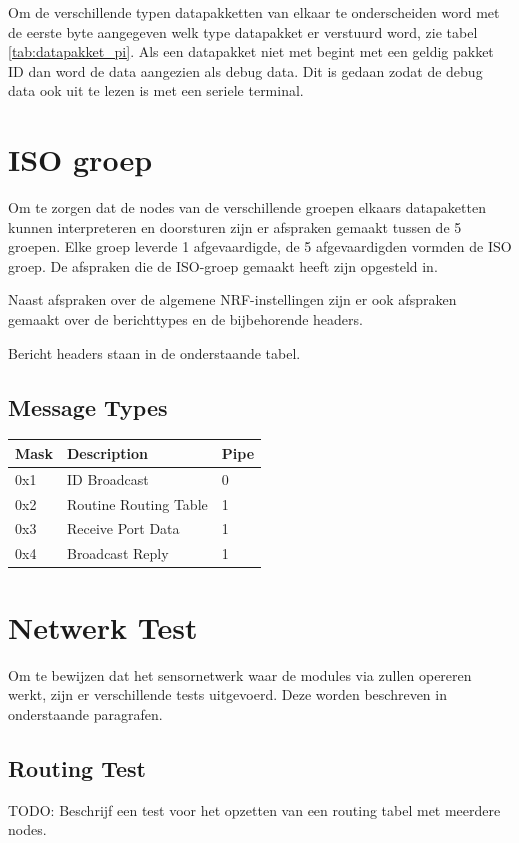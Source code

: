 \documentclass[a4paper, 11pt]{article}
\begin{document}
Om de verschillende typen datapakketten van elkaar te onderscheiden word met de eerste byte aangegeven welk type datapakket er verstuurd word, zie tabel \ref{tab:datapakket_pi}. Als een datapakket niet met begint met een geldig pakket ID dan word de data aangezien als debug data. Dit is gedaan zodat de debug data ook uit te lezen is met een seriele terminal.

\section{ISO groep}
Om te zorgen dat de nodes van de verschillende groepen elkaars datapaketten kunnen interpreteren en doorsturen zijn er afspraken gemaakt tussen de 5 groepen. Elke groep leverde 1 afgevaardigde, de 5 afgevaardigden vormden de ISO groep. De afspraken die de ISO-groep gemaakt heeft zijn opgesteld in\cite{ISO}.

Naast afspraken over de algemene NRF-instellingen zijn er ook afspraken gemaakt over de berichttypes en de bijbehorende headers.

Bericht headers staan in de onderstaande tabel.

\subsection*{Message Types}
\begin{table}[!ht]
\begin{tabular}{|l|l|l|}
\hline
\rowcolor[HTML]{EFEFEF}
Mask & Description           & Pipe \\ \hline
0x1  & ID Broadcast          & 0    \\ \hline
0x2  & Routine Routing Table & 1    \\ \hline
0x3  & Receive Port Data     & 1    \\ \hline
0x4  & Broadcast Reply       & 1    \\ \hline
\end{tabular}
\end{table}

\section{Netwerk Test}
Om te bewijzen dat het sensornetwerk waar de modules via zullen opereren werkt, zijn er verschillende tests uitgevoerd. Deze worden beschreven in onderstaande paragrafen.
\subsection{Routing Test}
TODO: Beschrijf een test voor het opzetten van een routing tabel met meerdere nodes.
\end{document}
